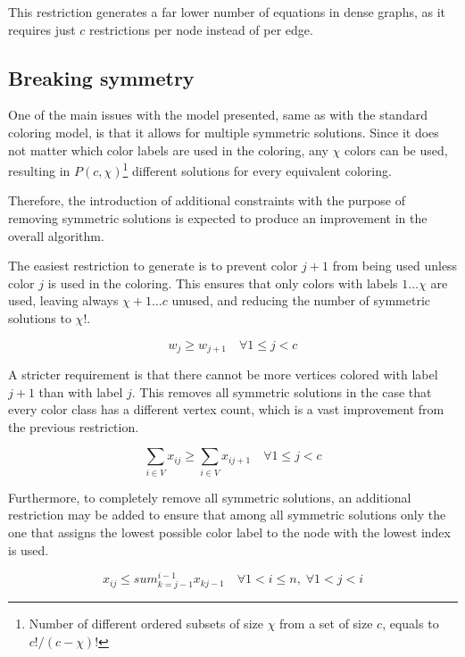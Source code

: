 This restriction generates a far lower number of equations in dense graphs, as it requires just $c$ restrictions per node instead of per edge.

\subsection{Breaking symmetry}

One of the main issues with the model presented, same as with the standard coloring model, is that it allows for multiple symmetric solutions. Since it does not matter which color labels are used in the coloring, any $\chi$ colors can be used, resulting in $P(c,\chi)$\footnote{Number of different ordered subsets of size $\chi$ from a set of size $c$, equals to $c! / (c - \chi)!$} different solutions for every equivalent coloring.

Therefore, the introduction of additional constraints with the purpose of removing symmetric solutions is expected to produce an improvement in the overall algorithm.

The easiest restriction to generate is to prevent color $j+1$ from being used unless color $j$ is used in the coloring. This ensures that only colors with labels $1 \ldots \chi$ are used, leaving always $\chi+1 \ldots c$ unused, and reducing the number of symmetric solutions to $\chi!$.

\begin{equation}
\label{eqn:lowerlabel}
w_j \geq w_{j+1} \quad \forall 1 \leq j < c 
\end{equation}

A stricter requirement is that there cannot be more vertices colored with label $j+1$ than with label $j$. This removes all symmetric solutions in the case that every color class has a different vertex count, which is a vast improvement from the previous restriction.

\begin{equation}
\label{eqn:symnodecount}
\sum_{i \in V} x_{ij} \geq \sum_{i \in V} x_{ij+1} \quad \forall 1 \leq j < c 
\end{equation}

Furthermore, to completely remove all symmetric solutions, an additional restriction may be added to ensure that among all symmetric solutions only the one that assigns the lowest possible color label to the node with the lowest index is used.

\begin{equation}
\label{eqn:minlabel}
x_{ij} \leq sum_{k = j-1}^{i-1} x_{kj-1} \quad \forall 1 < i \leq n, \; \forall 1 < j < i
\end{equation}


